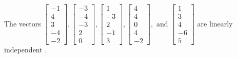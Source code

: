 \begin{exercise}
\begin{exerciseStatement}
  \end{exerciseStatement}
  \begin{exerciseAnswer}
   The vectors \(\left[\begin{array}{r}
-1 \\
4 \\
3 \\
-4 \\
-2
\end{array}\right] , \left[\begin{array}{r}
-3 \\
-4 \\
-3 \\
2 \\
0
\end{array}\right] , \left[\begin{array}{r}
1 \\
-3 \\
2 \\
-1 \\
3
\end{array}\right] , \left[\begin{array}{r}
4 \\
4 \\
0 \\
4 \\
-2
\end{array}\right] , \text{ and } \left[\begin{array}{r}
1 \\
3 \\
4 \\
-6 \\
5
\end{array}\right]\) are 
  	 linearly independent  .
  


  \end{exerciseAnswer}
\end{exercise}